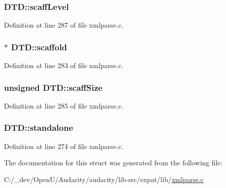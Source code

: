 \subsubsection[{\texorpdfstring{scaff\+Level}{scaffLevel}}]{ D\+T\+D\+::scaff\+Level}\hypertarget{struct_d_t_d_a6a88dfceb3b17719c9614b3a69be2224}{}\label{struct_d_t_d_a6a88dfceb3b17719c9614b3a69be2224}


Definition at line 287 of file xmlparse.\+c.

\subsubsection[{\texorpdfstring{scaffold}{scaffold}}]{$\ast$ D\+T\+D\+::scaffold}\hypertarget{struct_d_t_d_a41d29527f2c2b5126d663f5316435697}{}\label{struct_d_t_d_a41d29527f2c2b5126d663f5316435697}


Definition at line 283 of file xmlparse.\+c.

\subsubsection[{\texorpdfstring{scaff\+Size}{scaffSize}}]{\setlength{\rightskip}{0pt plus 5cm}unsigned D\+T\+D\+::scaff\+Size}\hypertarget{struct_d_t_d_a31cf19bf796dd6cda1705418bc1dc601}{}\label{struct_d_t_d_a31cf19bf796dd6cda1705418bc1dc601}


Definition at line 285 of file xmlparse.\+c.

\subsubsection[{\texorpdfstring{standalone}{standalone}}]{ D\+T\+D\+::standalone}\hypertarget{struct_d_t_d_abcf3c294cd95b1408fb0df186667bd56}{}\label{struct_d_t_d_abcf3c294cd95b1408fb0df186667bd56}


Definition at line 274 of file xmlparse.\+c.



The documentation for this struct was generated from the following file\+:\begin{DoxyCompactItemize}
\item 
C\+:/\+\_\+dev/\+Open\+U/\+Audacity/audacity/lib-\/src/expat/lib/\hyperlink{xmlparse_8c}{xmlparse.\+c}\end{DoxyCompactItemize}
